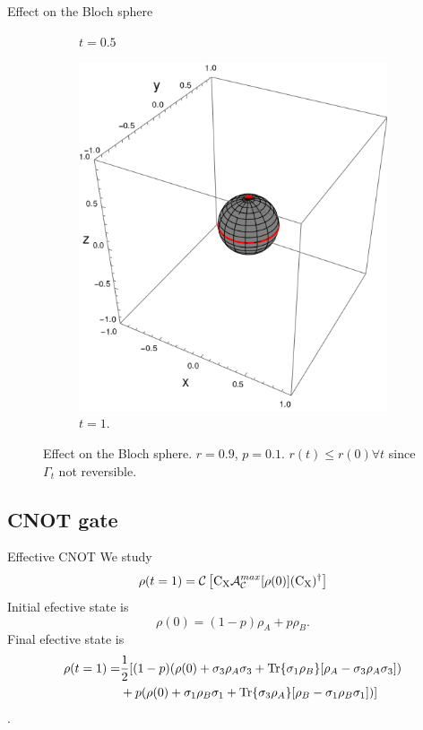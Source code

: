 \begin{frame}{Effect on the Bloch sphere}
\begin{figure}[h!]
\begin{subfigure}{0.32\textwidth}
            \caption{$t=0.5$}
        \end{subfigure}
        \begin{subfigure}{0.32\textwidth}
            \centering
            \includegraphics[width=0.9\linewidth]{figures/sphere_swapcontraction_t=1.0_z=0.9_p=0.9.png}
            \caption{$t=1.$}
        \end{subfigure}
        \caption{Effect on the Bloch sphere. $r=0.9$, $p=0.1$. $r(t)\leq r(0) \forall t$ since $\Gamma_{t}$ not reversible.}
    \end{figure}
\end{frame}

\subsection{CNOT gate}

\begin{frame}{Effective CNOT}
    We study
    \begin{equation*}
        \rho(t=1)=\mathcal{C}\left[\text{C}_{\text{X}} \mathcal{A}_{\mathcal{C}}^{max}[\rho(0)](\text{C}_{\text{X}})^{\dag}\right]
    \end{equation*}
    Initial efective state is
    \begin{equation*}
        \rho(0)=(1-p)\rho_{A}+p\rho_{B}.
    \end{equation*}
    Final efective state is
    \begin{align*}
        \rho(t=1)=&\frac{1}{2}[(1-p)(\rho(0)+\sigma_{3}\rho_{A}\sigma_{3}+\Tr{\sigma_{1}\rho_{B}}[\rho_{A}-\sigma_{3}\rho_{A}\sigma_{3}])\\
        &+p(\rho(0)+\sigma_{1}\rho_{B}\sigma_{1}+\Tr{\sigma_{3}\rho_{A}}[\rho_{B}-\sigma_{1}\rho_{B}\sigma_{1}])]
    \end{align*}.
\end{frame}

